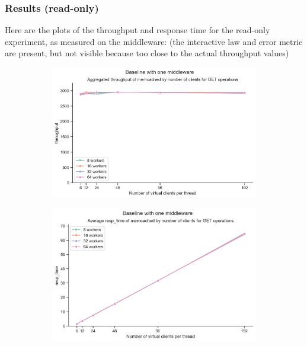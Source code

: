 \documentclass[11pt,a4paper]{article}
\begin{document}
\begin{itemize}
\end{itemize}

\subsubsection{Results (read-only)}

Here are the plots of the throughput and response time for the read-only
experiment, as measured on the middleware:
(the interactive law and error metric are present, but not visible because too close to the 
actual throughput values)

\begin{figure}[H]
	\begin{subfigure}[b]{0.5\linewidth}
		\includegraphics[width=\linewidth]{images/middleware_1/last_graph_get_throughput.pdf}
	\end{subfigure}
	\begin{subfigure}[b]{0.5\linewidth}
		\includegraphics[width=\linewidth]{images/middleware_1/last_graph_get_resp_time.pdf}
	\end{subfigure}
	\caption{}
	\label{fig:oddio}
\end{figure}
\end{document}
